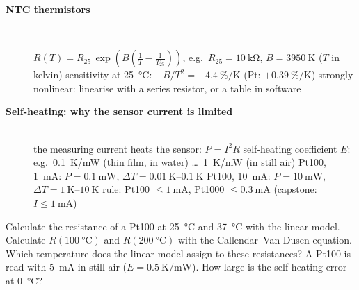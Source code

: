 \begin{description}
\item[{\rot\bf NTC thermistors}]~\\[-\lblskip]
\begin{center}
\end{center}
\bi
	\ite $R(T) = R_{25}\,\exp\!\left(B\left(\frac1T - \frac{1}{T_{25}}\right)\right)$, e.g.\ $R_{25} = \SI{10}{\kilo\ohm}$, $B = \SI{3950}{\kelvin}$ ($T$ in kelvin)
	\ite sensitivity at \SI{25}{\celsius}: $-B/T^2 = -\SI{4.4}{\percent/\kelvin}$ (Pt: $+\SI{0.39}{\percent/\kelvin}$)
	\ite strongly nonlinear: linearise with a series resistor, or a table in software
\ei
\os{\newpage}

\item[{\rot\bf Self-heating: why the sensor current is limited}]~\\[-\lblskip]
\bi
	\ite the measuring current heats the sensor: $P = I^2 R$
	\ite self-heating coefficient $E$: e.g.\ \SI{0.1}{\kelvin/\milli\watt} (thin film, in water) \ldots\ \SI{1}{\kelvin/\milli\watt} (in still air)
	\ite Pt100, \SI{1}{\milli\ampere}: $P = \SI{0.1}{\milli\watt}$, $\Delta T = \SIrange{0.01}{0.1}{\kelvin}$
	\ite Pt100, \SI{10}{\milli\ampere}: $P = \SI{10}{\milli\watt}$, $\Delta T = \SIrange{1}{10}{\kelvin}$
	\ite rule: Pt100 $\leq \SI{1}{\milli\ampere}$, Pt1000 $\leq \SI{0.3}{\milli\ampere}$ \quad (capstone: $I \leq \SI{1}{\milli\ampere}$)
\ei
{}
\os{\newpage}
\end{description}

\begin{talist}
\ta Calculate the resistance of a Pt100 at \SI{25}{\celsius} and \SI{37}{\celsius} with the linear model.
\ta Calculate $R(\SI{100}{\celsius})$ and $R(\SI{200}{\celsius})$ with the Callendar--Van Dusen equation. Which temperature does the linear model assign to these resistances?
\ta A Pt100 is read with \SI{5}{\milli\ampere} in still air ($E = \SI{0.5}{\kelvin/\milli\watt}$). How large is the self-heating error at \SI{0}{\celsius}?
\end{talist}

